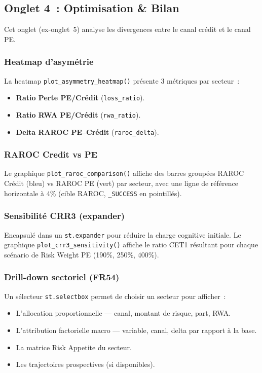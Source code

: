 \documentclass[12pt,a4paper]{article}
\begin{document}
\subsection{Onglet 4~: Optimisation \& Bilan}
\label{sec:tab4}

Cet onglet (ex-onglet~5) analyse les divergences entre le canal cr\'edit et le canal PE.

\subsubsection{Heatmap d'asym\'etrie}

La heatmap \texttt{plot\_asymmetry\_heatmap()} pr\'esente 3 m\'etriques par secteur~:
\begin{itemize}[leftmargin=2em]
    \item \textbf{Ratio Perte PE/Cr\'edit} (\texttt{loss\_ratio}).
    \item \textbf{Ratio RWA PE/Cr\'edit} (\texttt{rwa\_ratio}).
    \item \textbf{Delta RAROC PE--Cr\'edit} (\texttt{raroc\_delta}).
\end{itemize}

\subsubsection{RAROC Credit vs PE}

Le graphique \texttt{plot\_raroc\_comparison()} affiche des barres group\'ees RAROC Cr\'edit (bleu) vs RAROC PE (vert) par secteur, avec une ligne de r\'ef\'erence horizontale \`a 4\% (cible RAROC, \texttt{\_SUCCESS} en pointill\'es).

\subsubsection{Sensibilit\'e CRR3 (expander)}

Encapsul\'e dans un \texttt{st.expander} pour r\'eduire la charge cognitive initiale. Le graphique \texttt{plot\_crr3\_sensitivity()} affiche le ratio CET1 r\'esultant pour chaque sc\'enario de Risk Weight PE (190\%, 250\%, 400\%).

\subsubsection{Drill-down sectoriel (FR54)}

Un s\'electeur \texttt{st.selectbox} permet de choisir un secteur pour afficher~:
\begin{itemize}[leftmargin=2em]
    \item L'allocation proportionnelle --- canal, montant de risque, part, RWA.
    \item L'attribution factorielle macro --- variable, canal, delta par rapport \`a la base.
    \item La matrice Risk Appetite du secteur.
    \item Les trajectoires prospectives (si disponibles).
\end{itemize}
\end{document}
